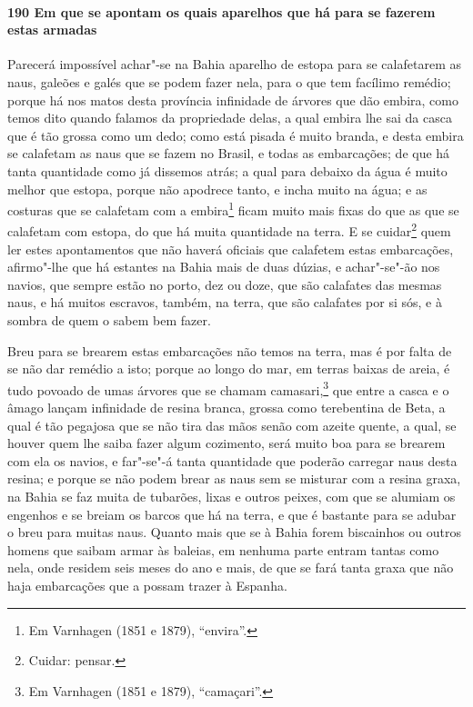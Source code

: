 \begin{linenumbers}
\paragraph{190 Em que se apontam os quais aparelhos que há para se fazerem estas armadas}\quad
Parecerá impossível achar"-se na Bahia aparelho de estopa para se calafetarem as naus,
galeões e galés que se podem fazer nela, para o que tem facílimo remédio; porque há nos
matos desta província infinidade de árvores que dão embira, como temos dito quando falamos
da propriedade delas, a qual embira lhe sai da casca que é tão grossa como um dedo; como
está pisada é muito branda, e desta embira se calafetam as naus que se fazem no Brasil, e
todas as embarcações; de que há tanta quantidade como já dissemos atrás; a qual para
debaixo da água é muito melhor que estopa, porque não apodrece tanto, e incha muito na
água; e as costuras que se calafetam com a embira\footnote{ Em Varnhagen (1851 e 1879),
``envira''.} ficam muito mais fixas do que as que se calafetam com estopa, do que há muita
quantidade na terra. E se cuidar\footnote{ Cuidar: pensar.} quem ler estes apontamentos
que não haverá oficiais que calafetem estas embarcações, afirmo"-lhe que há
estantes na Bahia mais de duas dúzias, e achar"-se"-ão nos navios, que sempre estão no
porto, dez ou doze, que são calafates das mesmas naus, e há muitos escravos, também, na
terra, que são calafates por si sós, e à sombra de quem o sabem bem fazer.

Breu para se brearem estas embarcações não temos na terra, mas é por falta de se não dar
remédio a isto; porque ao longo do mar, em terras baixas de areia, é tudo povoado de umas
árvores que se chamam camasari,\footnote{ Em Varnhagen (1851 e 1879), ``camaçari''.} que
entre a casca e o âmago lançam infinidade de resina branca, grossa como terebentina de
Beta, a qual é tão pegajosa que se não tira das mãos senão com azeite quente, a qual, se
houver quem lhe saiba fazer algum cozimento, será muito boa para se brearem com ela os
navios, e far"-se"-á tanta quantidade que poderão carregar naus desta resina; e porque se
não podem brear as naus sem se misturar com a resina graxa, na Bahia se faz muita de
tubarões, lixas e outros peixes, com que se alumiam os engenhos e se breiam os barcos que
há na terra, e que é bastante para se adubar o breu para muitas naus. Quanto mais que se à
Bahia forem biscainhos ou outros homens que saibam armar às baleias, em nenhuma parte
entram tantas como nela, onde residem seis meses do ano e mais, de que se fará tanta graxa
que não haja embarcações que a possam trazer à Espanha.


\end{linenumbers}
